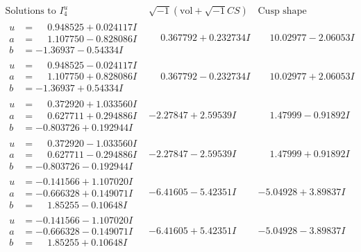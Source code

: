 \documentclass[1p]{elsarticle_modified}
\theoremstyle{definition}
\newcommand{\I}{\sqrt{-1}}
\begin{document}
$$\begin{array}{c|c|c}  
\text{Solutions to }I^u_{4}& \I (\text{vol} + \sqrt{-1}CS) & \text{Cusp shape}\\
 \hline 
\begin{aligned}
u &= \phantom{-}0.948525 + 0.024117 I \\
a &= \phantom{-}1.107750 - 0.828086 I \\
b &= -1.36937 - 0.54334 I\end{aligned}
 & \phantom{-}0.367792 + 0.232734 I & \phantom{-}10.02977 - 2.06053 I \\ \hline\begin{aligned}
u &= \phantom{-}0.948525 - 0.024117 I \\
a &= \phantom{-}1.107750 + 0.828086 I \\
b &= -1.36937 + 0.54334 I\end{aligned}
 & \phantom{-}0.367792 - 0.232734 I & \phantom{-}10.02977 + 2.06053 I \\ \hline\begin{aligned}
u &= \phantom{-}0.372920 + 1.033560 I \\
a &= \phantom{-}0.627711 + 0.294886 I \\
b &= -0.803726 + 0.192944 I\end{aligned}
 & -2.27847 + 2.59539 I & \phantom{-}1.47999 - 0.91892 I \\ \hline\begin{aligned}
u &= \phantom{-}0.372920 - 1.033560 I \\
a &= \phantom{-}0.627711 - 0.294886 I \\
b &= -0.803726 - 0.192944 I\end{aligned}
 & -2.27847 - 2.59539 I & \phantom{-}1.47999 + 0.91892 I \\ \hline\begin{aligned}
u &= -0.141566 + 1.107020 I \\
a &= -0.666328 + 0.149071 I \\
b &= \phantom{-}1.85255 - 0.10648 I\end{aligned}
 & -6.41605 - 5.42351 I & -5.04928 + 3.89837 I \\ \hline\begin{aligned}
u &= -0.141566 - 1.107020 I \\
a &= -0.666328 - 0.149071 I \\
b &= \phantom{-}1.85255 + 0.10648 I\end{aligned}
 & -6.41605 + 5.42351 I & -5.04928 - 3.89837 I \\ \hline\begin{aligned}

\end{aligned}
\end{array}$$
\end{document}
